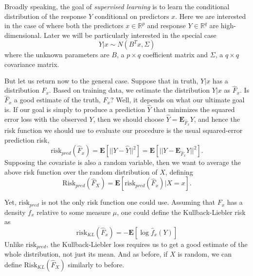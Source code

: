 \documentclass[12pt]{article}
\begin{document}
\maketitle

\newcommand{\tr}{\text{tr}}
\newcommand{\E}{\textbf{E}}
\newcommand{\diag}{\text{diag}}
\newcommand{\argmax}{\text{argmax}}
\newcommand{\Cov}{\text{Cov}}
\newcommand{\Var}{\text{Var}}
\newcommand{\argmin}{\text{argmin}}
\newcommand{\Vol}{\text{Vol}}
\newcommand{\comm}[1]{}

Broadly speaking, the goal of \emph{supervised learning} is to learn
the conditional distribution of the response $Y$ conditional on
predictors $x$.  Here we are interested in the case of where both the
predictors $x \in \mathbb{R}^p$ and response $Y \in \mathbb{R}^q$ are
high-dimensional.  Later we will be particularly interested in the
special case
$$
Y|x \sim N(B^T x, \Sigma)
$$
where the unknown parameters are $B$, a $p \times q$ coefficient
matrix and $\Sigma$, a $q \times q$ covariance matrix.

But let us return now to the general case.  Suppose that in truth,
$Y|x$ has a distribution $F_x$.  Based on training data, we estimate
the distribution $Y|x$ as $\hat{F}_x$.  Is $\hat{F}_x$ a good estimate
of the truth, $F_x$?  Well, it depends on what our ultimate goal is.
If our goal is simply to produce a prediction $\hat{Y}$ that minimizes
the squared error loss with the observed $Y$, then we should choose
$\hat{Y} = \E_{\hat{F}_x} Y$, and hence the risk function we should
use to evaluate our procedure is the usual squared-error prediction
risk,
\[
\text{risk}_{pred}(\hat{F}_x) = \E[||Y - \hat{Y}||^2] = \E[||Y - \E_{\hat{F}_x} Y||^2].
\]
Supposing the covariate is also a random variable, then we want to
average the above risk function over the random distribution of $X$,
defining
\[
\text{Risk}_{pred}(\hat{F}_X) = \E[\text{risk}_{pred}(\hat{F}_x)|X = x].
\]

Yet, $\text{risk}_{pred}$ is not the only risk function one could use.
Assuming that $F_x$ has a density $f_x$ relative to some measure $\mu$, one
could define the Kullback-Liebler risk as
\[
\text{risk}_{KL}(\hat{F}_x) = -\E[\log \hat{f}_x(Y)]
\]
Unlike $\text{risk}_{pred}$, the Kullback-Liebler loss requires us to
get a good estimate of the whole distribution, not just its mean.  And
as before, if $X$ is random, we can define
$\text{Risk}_{KL}(\hat{F}_X)$ similarly to before.
\end{document}

